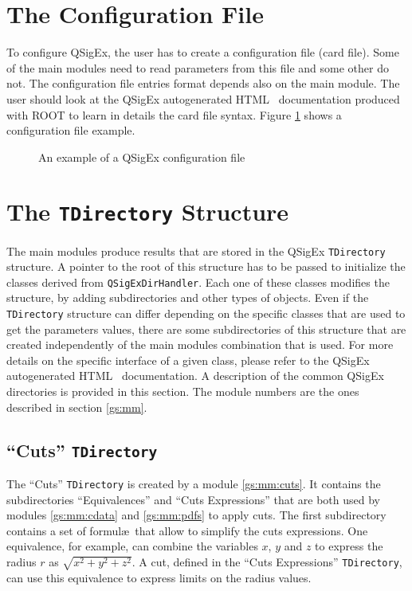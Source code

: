 \section{The Configuration File}
To configure QSigEx, the user has to create a configuration file (card file).
Some of the main modules need to read parameters from this file and some other do not.
The configuration file entries format depends also on the main module.
The user should look at the QSigEx autogenerated HTML~\cite{QSigEx:HTML} documentation produced with ROOT to learn in details the card file syntax.
Figure \ref{qi:cf:ex} shows a configuration file example.

\begin{figure}
\centering

\caption{An example of a QSigEx configuration file}
\label{qi:cf:ex}
\end{figure} 

\section{The \texttt{TDirectory} Structure}
The main modules produce results that are stored in the QSigEx \texttt{TDirectory} structure.
A pointer to the root of this structure has to be passed to initialize the classes derived from \texttt{QSigExDirHandler}.
Each one of these classes modifies the structure, by adding subdirectories and other types of objects.
Even if the \texttt{TDirectory} structure can differ depending on the specific classes that are used to get the parameters values, there are some subdirectories of this structure that are created independently of the main modules combination that is used.
For more details on the specific interface of a given class, please refer to the QSigEx autogenerated HTML~\cite{QSigEx:HTML} documentation.
A description of the common QSigEx directories is provided in this section.
The module numbers are the ones described in section \ref{gs:mm}.

\subsection{``Cuts'' \texttt{TDirectory}}
The ``Cuts'' \texttt{TDirectory} is created by a module \ref{gs:mm:cuts}.
It contains the subdirectories ``Equivalences'' and ``Cuts Expressions'' that are both used by modules \ref{gs:mm:cdata} and \ref{gs:mm:pdfs} to apply cuts.
The first subdirectory contains a set of formul\ae\  that allow to simplify the cuts expressions.
One equivalence, for example, can combine the variables $x$, $y$ and $z$ to express the radius $r$ as $\sqrt{x^2+y^2+z^2}$.
A cut, defined in the ``Cuts Expressions'' \texttt{TDirectory}, can use this equivalence to express limits on the radius values. 


